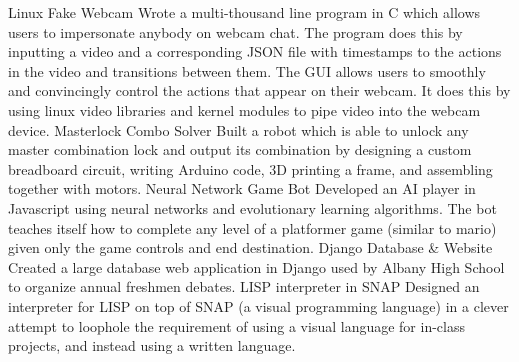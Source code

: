


\begin{cvskills}

  \vspace{1mm}
  \cvskill
    {Linux Fake Webcam} %
    {Wrote a multi-thousand line program in C which allows users to impersonate anybody on webcam chat. The program does this by inputting a video and a corresponding JSON file with timestamps to the actions in the video and transitions between them. The GUI allows users to smoothly and convincingly control the actions that appear on their webcam. It does this by using linux video libraries and kernel modules to pipe video into the webcam device.} %
  \vspace{1mm}
\cvskill
    {Masterlock Combo Solver} %
    {Built a robot which is able to unlock any master combination lock and output its combination by designing a custom breadboard circuit, writing Arduino code, 3D printing a frame, and assembling together with motors.} %
  \vspace{1mm}
\cvskill
  {Neural Network Game Bot}
  {Developed an AI player in Javascript using neural networks and evolutionary learning algorithms. The bot teaches itself how to complete any level of a platformer game (similar to mario) given only the game controls and end destination.}
  \vspace{1mm}
  \cvskill
    {Django Database \& Website} %
    {Created a large database web application in Django used by Albany High School to organize annual freshmen debates.} %
  \cvskill
    {LISP interpreter in SNAP} %
    {Designed an interpreter for LISP on top of SNAP (a visual programming language) in a clever attempt to loophole the requirement of using a visual language for in-class projects, and instead using a written language.} %
  \vspace{1mm}

\end{cvskills}
